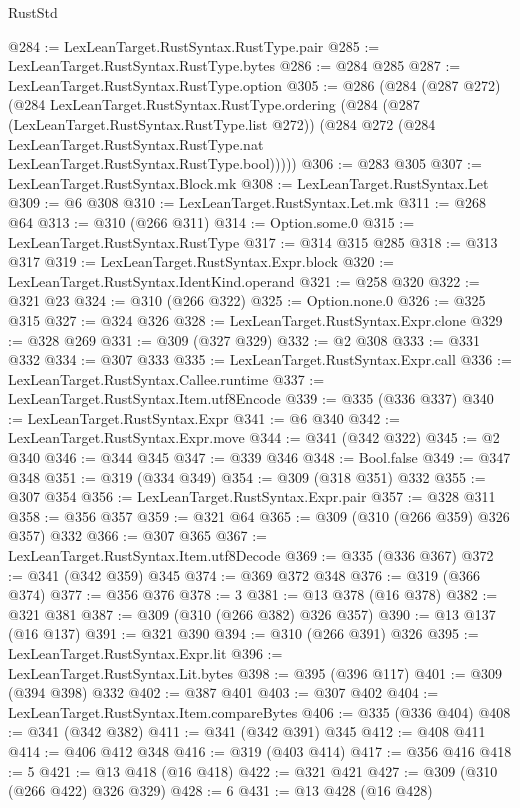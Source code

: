 \begin{lexlean}{RustStd}
\begin{coremodule}
@284 := LexLeanTarget.RustSyntax.RustType.pair
@285 := LexLeanTarget.RustSyntax.RustType.bytes
@286 := @284 @285
@287 := LexLeanTarget.RustSyntax.RustType.option
@305 := @286
    (@284
      (@287 @272)
      (@284
        LexLeanTarget.RustSyntax.RustType.ordering
        (@284
          (@287 (LexLeanTarget.RustSyntax.RustType.list @272))
          (@284
            @272
            (@284 LexLeanTarget.RustSyntax.RustType.nat LexLeanTarget.RustSyntax.RustType.bool)))))
@306 := @283 @305
@307 := LexLeanTarget.RustSyntax.Block.mk
@308 := LexLeanTarget.RustSyntax.Let
@309 := @6 @308
@310 := LexLeanTarget.RustSyntax.Let.mk
@311 := @268 @64
@313 := @310 (@266 @311)
@314 := Option.some.{0}
@315 := LexLeanTarget.RustSyntax.RustType
@317 := @314 @315 @285
@318 := @313 @317
@319 := LexLeanTarget.RustSyntax.Expr.block
@320 := LexLeanTarget.RustSyntax.IdentKind.operand
@321 := @258 @320
@322 := @321 @23
@324 := @310 (@266 @322)
@325 := Option.none.{0}
@326 := @325 @315
@327 := @324 @326
@328 := LexLeanTarget.RustSyntax.Expr.clone
@329 := @328 @269
@331 := @309 (@327 @329)
@332 := @2 @308
@333 := @331 @332
@334 := @307 @333
@335 := LexLeanTarget.RustSyntax.Expr.call
@336 := LexLeanTarget.RustSyntax.Callee.runtime
@337 := LexLeanTarget.RustSyntax.Item.utf8Encode
@339 := @335 (@336 @337)
@340 := LexLeanTarget.RustSyntax.Expr
@341 := @6 @340
@342 := LexLeanTarget.RustSyntax.Expr.move
@344 := @341 (@342 @322)
@345 := @2 @340
@346 := @344 @345
@347 := @339 @346
@348 := Bool.false
@349 := @347 @348
@351 := @319 (@334 @349)
@354 := @309 (@318 @351) @332
@355 := @307 @354
@356 := LexLeanTarget.RustSyntax.Expr.pair
@357 := @328 @311
@358 := @356 @357
@359 := @321 @64
@365 := @309 (@310 (@266 @359) @326 @357) @332
@366 := @307 @365
@367 := LexLeanTarget.RustSyntax.Item.utf8Decode
@369 := @335 (@336 @367)
@372 := @341 (@342 @359) @345
@374 := @369 @372 @348
@376 := @319 (@366 @374)
@377 := @356 @376
@378 := 3
@381 := @13 @378 (@16 @378)
@382 := @321 @381
@387 := @309 (@310 (@266 @382) @326 @357)
@390 := @13 @137 (@16 @137)
@391 := @321 @390
@394 := @310 (@266 @391) @326
@395 := LexLeanTarget.RustSyntax.Expr.lit
@396 := LexLeanTarget.RustSyntax.Lit.bytes
@398 := @395 (@396 @117)
@401 := @309 (@394 @398) @332
@402 := @387 @401
@403 := @307 @402
@404 := LexLeanTarget.RustSyntax.Item.compareBytes
@406 := @335 (@336 @404)
@408 := @341 (@342 @382)
@411 := @341 (@342 @391) @345
@412 := @408 @411
@414 := @406 @412 @348
@416 := @319 (@403 @414)
@417 := @356 @416
@418 := 5
@421 := @13 @418 (@16 @418)
@422 := @321 @421
@427 := @309 (@310 (@266 @422) @326 @329)
@428 := 6
@431 := @13 @428 (@16 @428)

\end{coremodule}
\end{lexlean}
